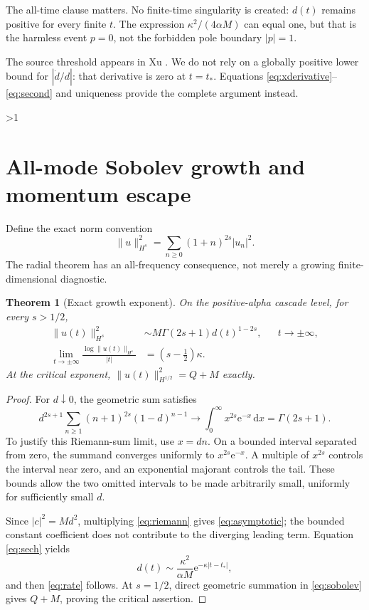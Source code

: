 \documentclass[10pt]{article}
\newcommand{\e}{\mathrm e}
\newcommand{\dd}{\,\mathrm d}
\newtheorem{theorem}{Theorem}
\begin{document}
The all-time clause matters. No finite-time singularity is created:
$d(t)$ remains positive for every finite $t$. The expression
$\kappa^2/(4\alpha M)$ can equal one, but that is the harmless event $p=0$,
not the forbidden pole boundary $|p|=1$.

The source threshold appears in Xu \cite[Theorem 3.1]{xu2014}.
We do not rely on a globally positive lower bound for
$|\dot d/d|$: that derivative is zero at $t=t_*$.
Equations \eqref{eq:xderivative}--\eqref{eq:second} and uniqueness provide
the complete argument instead.
\fi

\ifnum\CRevisionRound>1
\section{All-mode Sobolev growth and momentum escape}
Define the exact norm convention
\begin{equation}
 \|u\|_{H^s}^2=\sum_{n\ge0}(1+n)^{2s}|u_n|^2.
 \label{eq:sobolev}
\end{equation}
The radial theorem has an all-frequency consequence, not merely a growing
finite-dimensional diagnostic.

\begin{theorem}[Exact growth exponent]
On the positive-alpha cascade level, for every $s>1/2$,
\begin{align}
 \|u(t)\|_{H^s}^2&\sim M\Gamma(2s+1)d(t)^{1-2s},
       && t\to\pm\infty,\label{eq:asymptotic}\\
 \lim_{t\to\pm\infty}\frac{\log\|u(t)\|_{H^s}}{|t|}
       &=(s-\tfrac12)\kappa.\label{eq:rate}
\end{align}
At the critical exponent,
$\|u(t)\|_{H^{1/2}}^2=Q+M$ exactly.
\end{theorem}
\begin{proof}
For $d\downarrow0$, the geometric sum satisfies
\begin{equation}
 d^{2s+1}\sum_{n\ge1}(n+1)^{2s}(1-d)^{n-1}
 \longrightarrow\int_0^\infty x^{2s}\e^{-x}\dd x=\Gamma(2s+1).
 \label{eq:riemann}
\end{equation}
To justify this Riemann-sum limit, use $x=dn$.
On a bounded interval separated from zero, the summand converges uniformly
to $x^{2s}\e^{-x}$. A multiple of $x^{2s}$ controls the interval near zero,
and an exponential majorant controls the tail.
These bounds allow the two omitted intervals to be made arbitrarily small,
uniformly for sufficiently small $d$.

Since $|c|^2=Md^2$, multiplying \eqref{eq:riemann} gives
\eqref{eq:asymptotic}; the bounded constant coefficient does not contribute
to the diverging leading term. Equation \eqref{eq:sech} yields
\begin{equation}
 d(t)\sim\frac{\kappa^2}{\alpha M}
             \e^{-\kappa|t-t_*|},
 \label{eq:radialtail}
\end{equation}
and then \eqref{eq:rate} follows. At $s=1/2$, direct geometric summation
in \eqref{eq:sobolev} gives $Q+M$, proving the critical assertion.
\end{proof}
\end{document}
